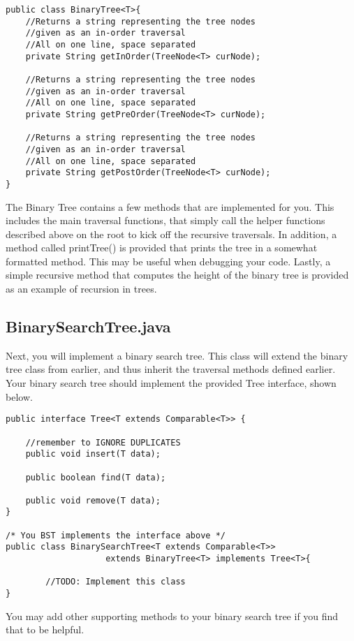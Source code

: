 \documentclass[paper=a4, fontsize=11pt, parskip=full]{scrartcl} %
\numberwithin{equation}{section} %
\numberwithin{figure}{section} %
\numberwithin{table}{section} %
\begin{document}
\begin{lstlisting}
public class BinaryTree<T>{
	//Returns a string representing the tree nodes
	//given as an in-order traversal
	//All on one line, space separated
	private String getInOrder(TreeNode<T> curNode);
	
	//Returns a string representing the tree nodes
	//given as an in-order traversal
	//All on one line, space separated
	private String getPreOrder(TreeNode<T> curNode);
	
	//Returns a string representing the tree nodes
	//given as an in-order traversal
	//All on one line, space separated
	private String getPostOrder(TreeNode<T> curNode);
}
\end{lstlisting}

The Binary Tree contains a few methods that are implemented for you. This includes the main traversal functions, that simply call the helper functions described above on the root to kick off the recursive traversals. In addition, a method called printTree() is provided that prints the tree in a somewhat formatted method. This may be useful when debugging your code. Lastly, a simple recursive method that computes the height of the binary tree is provided as an example of recursion in trees.

\subsection{BinarySearchTree.java}

Next, you will implement a binary search tree. This class will extend the binary tree class from earlier, and thus inherit the traversal methods defined earlier. Your binary search tree should implement the provided Tree interface, shown below. 

\begin{lstlisting}
public interface Tree<T extends Comparable<T>> {
	
	//remember to IGNORE DUPLICATES
	public void insert(T data);
	
	public boolean find(T data);

	public void remove(T data);
}

/* You BST implements the interface above */
public class BinarySearchTree<T extends Comparable<T>>
					extends BinaryTree<T> implements Tree<T>{

		//TODO: Implement this class
}
\end{lstlisting}

You may add other supporting methods to your binary search tree if you find that to be helpful. 
\end{document}
